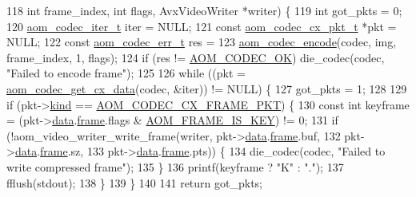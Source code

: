 \begin{DoxyCodeInclude}
{118                         \textcolor{keywordtype}{int} frame\_index, \textcolor{keywordtype}{int} flags, AvxVideoWriter *writer) \{
119   \textcolor{keywordtype}{int} got\_pkts = 0;
120   \hyperlink{group__codec_gadf9e173c9e02788a9999399edab20a02}{aom\_codec\_iter\_t} iter = NULL;
121   \textcolor{keyword}{const} \hyperlink{structaom__codec__cx__pkt}{aom\_codec\_cx\_pkt\_t} *pkt = NULL;
122   \textcolor{keyword}{const} \hyperlink{group__codec_gaaae61e0f8663e6137f1e228757248e7c}{aom\_codec\_err\_t} res =
123       \hyperlink{group__encoder_ga6f4a777de5389771e783df7ff1f116d4}{aom\_codec\_encode}(codec, img, frame\_index, 1, flags);
124   \textcolor{keywordflow}{if} (res != \hyperlink{group__codec_ggaaae61e0f8663e6137f1e228757248e7caf145dc2f86014a08ebad36ac2b140001}{AOM\_CODEC\_OK}) die\_codec(codec, \textcolor{stringliteral}{"Failed to encode frame"});
125 
126   \textcolor{keywordflow}{while} ((pkt = \hyperlink{group__encoder_gaedc4c56b60d4217677cb561066360884}{aom\_codec\_get\_cx\_data}(codec, &iter)) != NULL) \{
127     got\_pkts = 1;
128 
129     \textcolor{keywordflow}{if} (pkt->\hyperlink{structaom__codec__cx__pkt_a11e586120c689ece9a7690e72ff384be}{kind} == \hyperlink{group__encoder_ggafeb69da4a9649a54e805f59c26d8dfeda793165d0f219812342f69d5fd9b2b9c8}{AOM\_CODEC\_CX\_FRAME\_PKT}) \{
130       \textcolor{keyword}{const} \textcolor{keywordtype}{int} keyframe = (pkt->\hyperlink{structaom__codec__cx__pkt_afb379cd4bfa7692d1d6e85f4e4b2b410}{data}.\hyperlink{structaom__codec__cx__pkt_a4180a6ae59b0d295bc915d4689df4cb0}{frame}.flags & \hyperlink{group__encoder_gaf4a58f123913a5eef0a3796f0619e5f3}{AOM\_FRAME\_IS\_KEY}) != 0;
131       \textcolor{keywordflow}{if} (!aom\_video\_writer\_write\_frame(writer, pkt->\hyperlink{structaom__codec__cx__pkt_afb379cd4bfa7692d1d6e85f4e4b2b410}{data}.\hyperlink{structaom__codec__cx__pkt_a4180a6ae59b0d295bc915d4689df4cb0}{frame}.buf,
132                                         pkt->\hyperlink{structaom__codec__cx__pkt_afb379cd4bfa7692d1d6e85f4e4b2b410}{data}.\hyperlink{structaom__codec__cx__pkt_a4180a6ae59b0d295bc915d4689df4cb0}{frame}.sz,
133                                         pkt->\hyperlink{structaom__codec__cx__pkt_afb379cd4bfa7692d1d6e85f4e4b2b410}{data}.\hyperlink{structaom__codec__cx__pkt_a4180a6ae59b0d295bc915d4689df4cb0}{frame}.pts)) \{
134         die\_codec(codec, \textcolor{stringliteral}{"Failed to write compressed frame"});
135       \}
136       printf(keyframe ? \textcolor{stringliteral}{"K"} : \textcolor{stringliteral}{"."});
137       fflush(stdout);
138     \}
139   \}
140 
141   \textcolor{keywordflow}{return} got\_pkts;
}
\end{DoxyCodeInclude}
